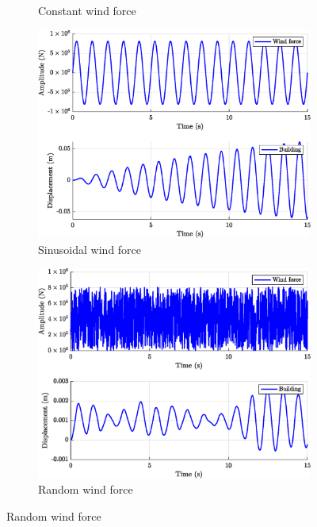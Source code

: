 \begin{figure}[H]
\begin{subfigure}{0.495\textwidth}
        \caption{Constant wind force}
        \label{fig:q4.constant}
    \end{subfigure}
    \begin{subfigure}{0.495\textwidth}
        \includegraphics[width=\textwidth]{resources/eps/sinusoidal-wind.eps}
        \caption{Sinusoidal wind force}
    \end{subfigure}
    \begin{subfigure}{0.495\textwidth}
        \includegraphics[width=\textwidth]{resources/eps/random-wind.eps}
        \caption{Random wind force}
    \end{subfigure}
\end{figure}
